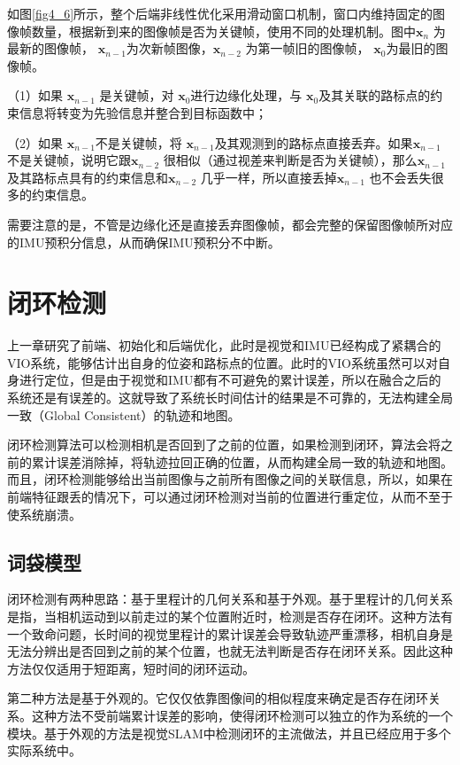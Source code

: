 如图\ref{fig4_6}所示，整个后端非线性优化采用滑动窗口机制，窗口内维持固定的图像帧数量，根据新到来的图像帧是否为关键帧，使用不同的处理机制。图中$\mathbf{x}_n $ 为最新的图像帧， $\mathbf{x}_{n-1} $为次新帧图像，$\mathbf{x}_{n-2} $ 为第一帧旧的图像帧， $\mathbf{x}_{0} $为最旧的图像帧。

（1）如果 $\mathbf{x}_{n-1} $ 是关键帧，对 $\mathbf{x}_{0} $进行边缘化处理，与 $\mathbf{x}_{0} $及其关联的路标点的约束信息将转变为先验信息并整合到目标函数中；

（2）如果 $\mathbf{x}_{n-1} $不是关键帧，将 $\mathbf{x}_{n-1} $及其观测到的路标点直接丢弃。如果$\mathbf{x}_{n-1} $ 不是关键帧，说明它跟$\mathbf{x}_{n-2} $ 很相似（通过视差来判断是否为关键帧），那么$\mathbf{x}_{n-1} $ 及其路标点具有的约束信息和$\mathbf{x}_{n-2} $ 几乎一样，所以直接丢掉$\mathbf{x}_{n-1} $ 也不会丢失很多的约束信息。

需要注意的是，不管是边缘化还是直接丢弃图像帧，都会完整的保留图像帧所对应的IMU预积分信息，从而确保IMU预积分不中断。
\section{闭环检测}
上一章研究了前端、初始化和后端优化，此时是视觉和IMU已经构成了紧耦合的VIO系统，能够估计出自身的位姿和路标点的位置。此时的VIO系统虽然可以对自身进行定位，但是由于视觉和IMU都有不可避免的累计误差，所以在融合之后的系统还是有误差的。这就导致了系统长时间估计的结果是不可靠的，无法构建全局一致（Global Consistent）的轨迹和地图。

闭环检测算法可以检测相机是否回到了之前的位置，如果检测到闭环，算法会将之前的累计误差消除掉，将轨迹拉回正确的位置，从而构建全局一致的轨迹和地图。而且，闭环检测能够给出当前图像与之前所有图像之间的关联信息，所以，如果在前端特征跟丢的情况下，可以通过闭环检测对当前的位置进行重定位，从而不至于使系统崩溃。
\subsection{词袋模型}
闭环检测有两种思路：基于里程计的几何关系和基于外观。基于里程计的几何关系是指，当相机运动到以前走过的某个位置附近时，检测是否存在闭环。这种方法有一个致命问题，长时间的视觉里程计的累计误差会导致轨迹严重漂移，相机自身是无法分辨出是否回到之前的某个位置，也就无法判断是否存在闭环关系。因此这种方法仅仅适用于短距离，短时间的闭环运动。

第二种方法是基于外观的。它仅仅依靠图像间的相似程度来确定是否存在闭环关系。这种方法不受前端累计误差的影响，使得闭环检测可以独立的作为系统的一个模块。基于外观的方法是视觉SLAM中检测闭环的主流做法，并且已经应用于多个实际系统中。

